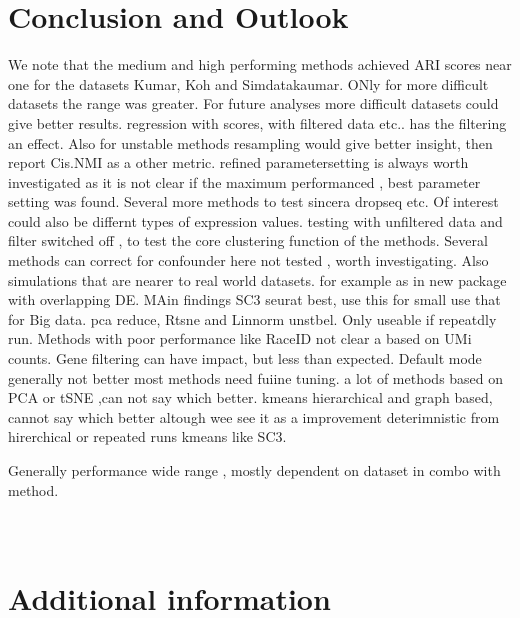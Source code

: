 \documentclass[12pt, a4paper]{article}\usepackage[]{graphicx}\usepackage[]{color}
\begin{document}
\section{Conclusion and Outlook} 
We note that the medium and high performing methods achieved ARI scores near one for the datasets Kumar, Koh and Simdatakaumar. ONly for more difficult datasets the range was greater. For future analyses more difficult datasets could give better results. regression with scores, with filtered data etc.. has the filtering an effect. 
Also for unstable methods  resampling would give better insight, then report Cis.NMI as a other metric. refined parametersetting is always worth investigated as it is not clear if the maximum performanced , best parameter setting was found. Several more methods to test sincera dropseq etc. 
Of interest could also be differnt types of expression values. 
testing with unfiltered data and filter switched off , to test the core clustering function of the methods.
Several methods can correct for confounder here not tested , worth investigating. Also simulations that are nearer to real world datasets. for example as in new package with overlapping DE. MAin findings SC3 seurat best, use this for small use that for Big data. pca reduce, Rtsne and Linnorm unstbel. Only useable if repeatdly run. Methods with poor performance like RaceID not clear a based on UMi counts. Gene filtering can have impact, but less than expected.  Default mode generally not better most methods need fuiine tuning. a lot of methods based on PCA or tSNE ,can not say which better. kmeans hierarchical and graph based, cannot say which better altough wee see it as a improvement deterimnistic from hirerchical or repeated runs kmeans like SC3.

Generally performance wide range , mostly dependent on dataset in combo with method.
\clearpage



\appendix 
\section{\\Additional information}
\end{document}
